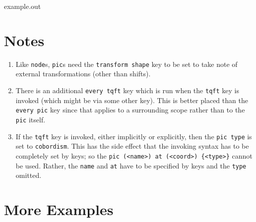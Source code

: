 \documentclass{ltxdoc}
\newenvironment{example}
  {\VerbatimEnvironment
   \begin{VerbatimOut}{example.out}}
  {\end{VerbatimOut}
   \begin{center}
   \setlength{\parindent}{0pt}
   \fbox{\begin{minipage}{.9\linewidth}
     \lstset{breakatwhitespace=true,breaklines=true,language=TeX,basicstyle=\small}
     
   \end{minipage}}

   \fbox{\begin{minipage}{.9\linewidth}
     \centering
     
   \end{minipage}}
\end{center}
}
\begin{document}
\begin{example}
\end{example}

\section{Notes}

\begin{enumerate}
\item Like \Verb+node+s, \Verb+pic+s need the \Verb+transform shape+ key to be set to take note of external transformations (other than shifts).
\item There is an additional \Verb+every tqft+ key which is run when the \Verb+tqft+ key is invoked (which might be via some other key).
This is better placed than the \Verb+every pic+ key since that applies to a surrounding scope rather than to the \Verb+pic+ itself.
\item If the \Verb+tqft+ key is invoked, either implicitly or explicitly, then the \Verb+pic type+ is set to \Verb+cobordism+.
This has the side effect that the invoking syntax has to be completely set by keys; so the \Verb+pic (<name>) at (<coord>) {<type>}+ cannot be used.
Rather, the \Verb+name+ and \Verb+at+ have to be specified by keys and the \Verb+type+ omitted.
\end{enumerate}

\section{More Examples}
\end{document}
